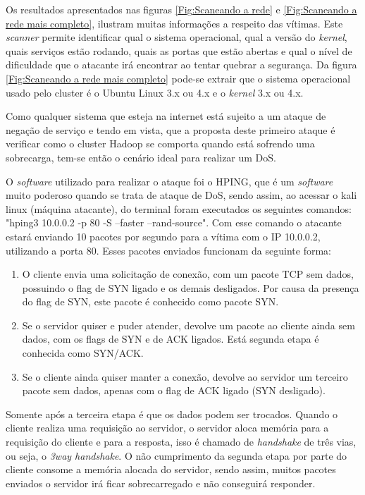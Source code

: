 Os resultados apresentados nas figuras \ref{Fig:Scaneando a rede} e \ref{Fig:Scaneando a rede mais completo}, ilustram muitas informações a respeito das vítimas. Este \textit{scanner} permite identificar qual o sistema operacional, qual a versão do \textit{kernel}, quais serviços estão rodando, quais as portas que estão abertas e qual o nível de dificuldade que o atacante irá encontrar ao tentar quebrar a segurança. Da figura \ref{Fig:Scaneando a rede mais completo} pode-se extrair que o sistema operacional usado pelo cluster é o Ubuntu Linux 3.x ou 4.x e o \textit{kernel} 3.x ou 4.x.

Como qualquer sistema que esteja na internet está sujeito a um ataque de negação de serviço e tendo em vista, que a proposta deste primeiro ataque é verificar como o cluster Hadoop se comporta quando está sofrendo uma sobrecarga, tem-se então o cenário ideal para realizar um DoS.

O \textit{software} utilizado para realizar o ataque foi o HPING, que é um \textit{software} muito poderoso quando se trata de ataque de DoS, sendo assim, ao acessar o kali linux (máquina atacante), do terminal foram executados os seguintes comandos: "hping3 10.0.0.2 -p 80 -S --faster --rand-source". Com esse comando o atacante estará enviando 10 pacotes por segundo para a vítima com o IP 10.0.0.2, utilizando a porta 80. Esses pacotes enviados funcionam da seguinte forma:

\begin{enumerate}
	\item O cliente envia uma solicitação de conexão, com um pacote TCP sem dados, possuindo o flag de SYN ligado e os demais desligados. Por causa da presença do flag de SYN, este pacote é conhecido como pacote SYN.
	
	\item Se o servidor quiser e puder atender, devolve um pacote ao cliente ainda sem dados, com os flags de SYN e de ACK ligados. Está segunda etapa é conhecida como SYN/ACK.
	
	\item Se o cliente ainda quiser manter a conexão, devolve ao servidor um terceiro pacote sem dados, apenas com o flag de ACK ligado (SYN desligado).
\end{enumerate}

Somente após a terceira etapa é que os dados podem ser trocados. Quando o cliente realiza uma requisição ao servidor, o servidor aloca memória para a requisição do cliente e para a resposta, isso é chamado de \textit{handshake} de três vias, ou seja, o \textit{3way handshake}. O não cumprimento da segunda etapa por parte do cliente consome a memória alocada do servidor, sendo assim, muitos pacotes enviados o servidor irá ficar sobrecarregado e não conseguirá responder.


